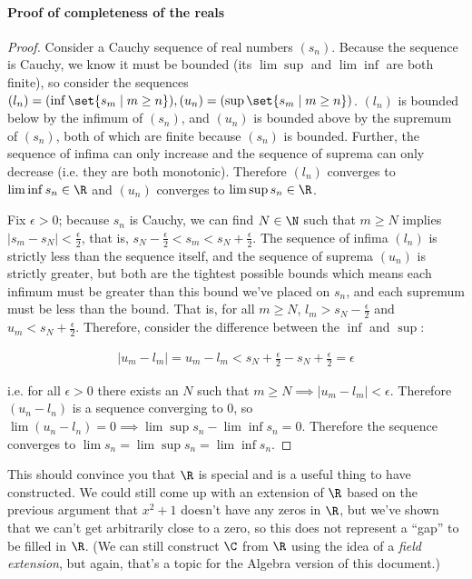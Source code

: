 \documentclass[./analysis.tex]{subfiles}
\begin{document}
    \paragraph*{Proof of completeness of the reals}
    \begin{proof}
        Consider a Cauchy sequence of real numbers $(s_n)$. Because the sequence is Cauchy, we know it must be bounded (its $\lim\sup$ and $\lim\inf$ are both finite), so consider the sequences $(l_n) = (\inf\set{s_m \mid m \geq n}), (u_n) = (\sup\set{s_m \mid m \geq n})$. $(l_n)$ is bounded below by the infimum of $(s_n)$, and $(u_n)$ is bounded above by the supremum of $(s_n)$, both of which are finite because $(s_n)$ is bounded. Further, the sequence of infima can only increase and the sequence of suprema can only decrease (i.e. they are both monotonic). Therefore $(l_n)$ converges to $\lim\inf s_n \in \R$ and $(u_n)$ converges to $\lim\sup s_n \in \R$.
        
        Fix $\epsilon > 0$; because $s_n$ is Cauchy, we can find $N \in \N$ such that $m \geq N$ implies $|s_m - s_N| < \frac{\epsilon}{2}$, that is, $s_N - \frac{\epsilon}{2} < s_m < s_N + \frac{\epsilon}{2}$. The sequence of infima $(l_n)$ is strictly less than the sequence itself, and the sequence of suprema $(u_n)$ is strictly greater, but both are the tightest possible bounds which means each infimum must be greater than this bound we've placed on $s_n$, and each supremum must be less than the bound. That is, for all $m \geq N$, $l_m > s_N - \frac{\epsilon}{2}$ and $u_m < s_N + \frac{\epsilon}{2}$. Therefore, consider the difference between the $\inf$ and $\sup$:

        \begin{align*}
            |u_m - l_m| = u_m - l_m < s_N + \frac{\epsilon}{2} - s_N + \frac{\epsilon}{2} = \epsilon
        \end{align*}

        i.e. for all $\epsilon > 0$ there exists an $N$ such that $m \geq N \implies |u_m - l_m| < \epsilon$. Therefore $(u_n - l_n)$ is a sequence converging to 0, so $\lim (u_n - l_n) = 0 \implies \lim\sup s_n - \lim\inf s_n = 0$. Therefore the sequence converges to $\lim s_n = \lim\sup s_n = \lim\inf s_n$.
    \end{proof}

    This should convince you that $\R$ is special and is a useful thing to have constructed. We could still come up with an extension of $\R$ based on the previous argument that $x^2 + 1$ doesn't have any zeros in $\R$, but we've shown that we can't get arbitrarily close to a zero, so this does not represent a ``gap'' to be filled in $\R$. (We can still construct $\C$ from $\R$ using the idea of a \emph{field extension}, but again, that's a topic for the Algebra version of this document.) 
    
\end{document}
